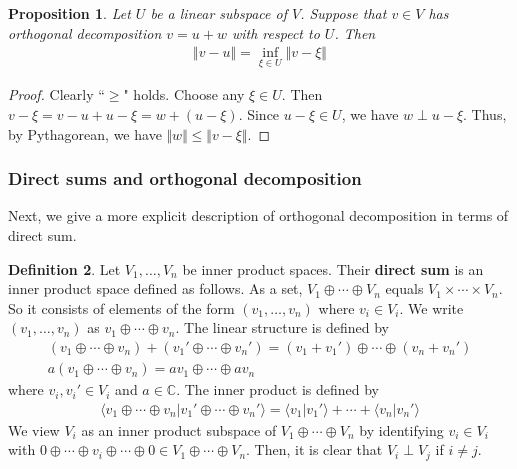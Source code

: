 \documentclass[12pt,b5paper,notitlepage]{article}
\theoremstyle{definition}
\newtheorem{df}{Definition}[section]
\theoremstyle{plain}
\newtheorem{pp}[df]{Proposition}
\newcommand{\bk}[1]{\langle {#1}\rangle}
\newcommand{\Cbb}{\mathbb C}
\numberwithin{equation}{section}
\begin{document}
\begin{pp}\label{lb120}
Let $U$ be a linear subspace of $V$. Suppose that $v\in V$ has orthogonal decomposition $v=u+w$ with respect to $U$. Then
\begin{align}
\Vert v-u\Vert=\inf_{\xi\in U}\Vert v-\xi\Vert
\end{align}
\end{pp}


\begin{proof}
Clearly ``$\geq$" holds. Choose any $\xi\in U$. Then $v-\xi=v-u+u-\xi=w+(u-\xi)$. Since $u-\xi\in U$, we have $w\perp u-\xi$. Thus, by Pythagorean, we have $\Vert w\Vert\leq\Vert v-\xi\Vert$.
\end{proof}



\subsubsection{Direct sums and orthogonal decomposition}

Next, we give a more explicit description of orthogonal decomposition in terms of direct sum.


\begin{df}
Let $V_1,\dots,V_n$ be inner product spaces. Their \textbf{direct sum}   is an inner product space defined as follows. As a set, $V_1\oplus\cdots\oplus V_n$ equals $V_1\times\cdots\times V_n$. So it consists of elements of the form $(v_1,\dots,v_n)$ where $v_i\in V_i$. We write $(v_1,\dots,v_n)$ as $v_1\oplus\cdots\oplus v_n$. The linear structure is defined by
\begin{gather*}
(v_1\oplus\cdots\oplus v_n)+(v_1'\oplus\cdots\oplus v_n')=(v_1+v_1')\oplus\cdots\oplus (v_n+v_n')\\
a(v_1\oplus\cdots\oplus v_n)=av_1\oplus\cdots\oplus av_n
\end{gather*}
where $v_i,v_i'\in V_i$ and $a\in\Cbb$. The inner product is defined by
\begin{align*}
\bk{v_1\oplus\cdots\oplus v_n|v_1'\oplus\cdots\oplus v_n'}=\bk{v_1|v_1'}+\cdots+\bk{v_n|v_n'}
\end{align*}
We view $V_i$ as an inner product subspace of $V_1\oplus\cdots\oplus V_n$ by identifying $v_i\in V_i$ with $0\oplus\cdots\oplus v_i\oplus\cdots\oplus 0\in V_1\oplus\cdots\oplus V_n$. Then, it is clear that $V_i\perp V_j$ if $i\neq j$.
\end{df}
\end{document}
